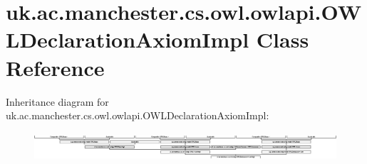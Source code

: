 \hypertarget{classuk_1_1ac_1_1manchester_1_1cs_1_1owl_1_1owlapi_1_1_o_w_l_declaration_axiom_impl}{\section{uk.\-ac.\-manchester.\-cs.\-owl.\-owlapi.\-O\-W\-L\-Declaration\-Axiom\-Impl Class Reference}
\label{classuk_1_1ac_1_1manchester_1_1cs_1_1owl_1_1owlapi_1_1_o_w_l_declaration_axiom_impl}
}
Inheritance diagram for uk.\-ac.\-manchester.\-cs.\-owl.\-owlapi.\-O\-W\-L\-Declaration\-Axiom\-Impl\-:\begin{figure}[H]
\begin{center}
\leavevmode
\includegraphics[height=1.063022cm]{classuk_1_1ac_1_1manchester_1_1cs_1_1owl_1_1owlapi_1_1_o_w_l_declaration_axiom_impl}
\end{center}
\end{figure}
